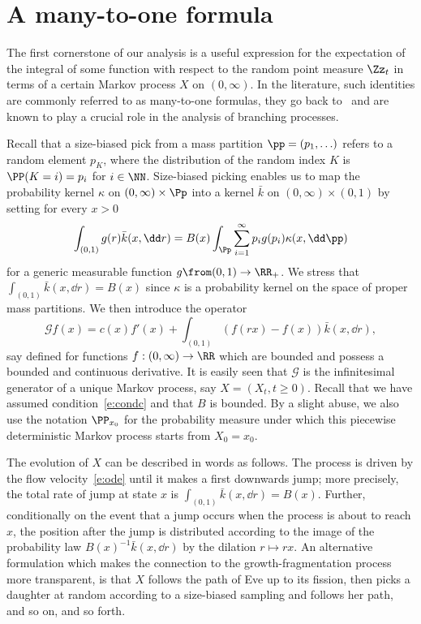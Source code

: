 \section{A many-to-one formula}\label{section3}

The first cornerstone of our analysis is a useful expression for the expectation of the integral of some function with respect to the random point measure $\Zz_t$ in terms of a certain Markov process $X$ on $(0,\infty)$. In the literature, such identities are commonly referred to as many-to-one formulas, they go back to~\cite{KaP, Pey} and are known to play a crucial role in the analysis of branching processes.

Recall that a size-biased pick from a mass partition $\pp=(p_1, \ldots)$ refers to a random element $p_K$, where the distribution of the random index $K$ is $\PP(K=i)=p_i$ for $i\in\NN$. Size-biased picking enables us to map the probability kernel $\kappa$ on $(0,\infty)\times \Pp$\label{s:kbar}
into a kernel $\bar k$ on $(0,\infty)\times (0,1)$ by setting for every $x>0$
\[
\int_{(0,1)} g(r)\bar k(x,\dd r)= {B}(x) \int_{\Pp} \sum_{i=1}^{\infty} p_ig(p_i) \kappa(x, \dd \pp)
\]
for a generic measurable function $g\from (0,1)\to \RR_+$. We stress that $\int_{(0,1)} \bar k(x,\dd r)= {B}(x)$ since $\kappa$ is a probability kernel on the space of proper mass partitions. We then introduce the operator
\[
{\mathcal G} f (x) = c(x) f'(x) +\int_{(0,1)} (f(rx) - f(x)) \bar k(x, \dd r),
\]
say defined for functions $f: (0,\infty)\to \RR$ which are bounded and possess a bounded and continuous derivative. It is easily seen that ${\mathcal G}$ is the infinitesimal generator of a unique Markov process, say $X=(X_t, t\geq 0)$. Recall that we have assumed condition~\eqref{e:condc} and that $B$ is bounded. By a slight abuse, we also use the notation $\PP_{x_0}$ for the probability measure under which this piecewise deterministic Markov process starts from $X_0=x_0$.

The evolution of $X$ can be described in words as follows. The process is driven by the flow velocity~\eqref{e:ode} until it makes a first downwards jump; more precisely, the total rate of jump at state $x$ is $\int_{(0,1)}\bar k(x,\dd r)={B}(x)$. Further, conditionally on the event that a jump occurs when the process is about to reach $x$, the position after the jump is distributed according to the image of the probability law ${B}(x)^{-1}\bar k(x, \dd r)$ by the dilation $r\mapsto rx$. An alternative formulation which makes the connection to the growth-fragmentation process more transparent, is that $X$ follows the path of Eve up to its fission, then picks a daughter at random according to a size-biased sampling and follows her path, and so on, and so forth.

